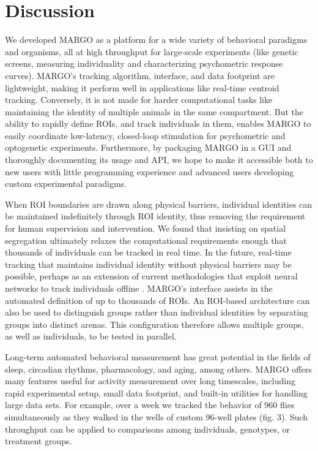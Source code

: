 \documentclass[10pt,letterpaper]{article}
\begin{document}
\section*{Discussion}
We developed MARGO as a platform for a wide variety of behavioral paradigms and organisms, all at high throughput for large-scale experiments (like genetic screens, measuring individuality and characterizing psychometric response curves). MARGO's tracking algorithm, interface, and data footprint are lightweight, making it perform well in applications like real-time centroid tracking. Conversely, it is not made for harder computational tasks like maintaining the identity of multiple animals in the same compartment. But the ability to rapidly define ROIs, and track individuals in them, enables MARGO to easily coordinate low-latency, closed-loop stimulation for psychometric and optogenetic experiments. Furthermore, by packaging MARGO in a GUI and thoroughly documenting its usage and API, we hope to make it accessible both to new users with little programming experience and advanced users developing custom experimental paradigms.

When ROI boundaries are drawn along physical barriers, individual identities can be maintained indefinitely through ROI identity, thus removing the requirement for human supervision and intervention. We found that insisting on spatial segregation ultimately relaxes the computational requirements enough that thousands of individuals can be tracked in real time. In the future, real-time tracking that maintains individual identity without physical barriers may be possible, perhaps as an extension of current methodologies that exploit neural networks to track individuals offline \cite{romero-ferrero_2019,schneider_2018}. MARGO's interface assists in the automated definition of up to thousands of ROIs. An ROI-based architecture can also be used to distinguish groups rather than individual identities by separating groups into distinct arenas. This configuration therefore allows multiple groups, as well as individuals, to be tested in parallel.

Long-term automated behavioral measurement has great potential in the fields of sleep, circadian rhythms, pharmacology, and aging, among others. MARGO offers many features useful for activity measurement over long timescales, including rapid experimental setup, small data footprint, and built-in utilities for handling large data sets. For example, over a week we tracked the behavior of 960 flies simultaneously as they walked in the wells of custom 96-well plates (fig. 3). Such throughput can be applied to comparisons among individuals, genotypes, or treatment groups. 
\end{document}
